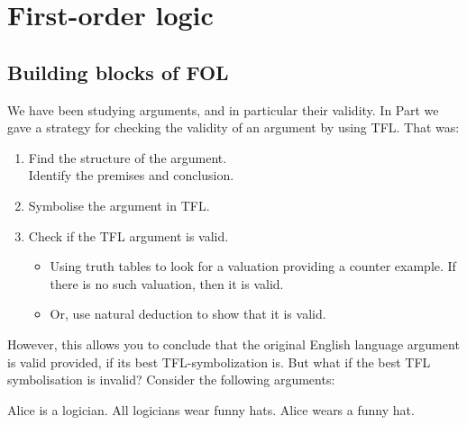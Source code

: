 \part{First-order logic}
\label{ch:FOL}
\chapter{Building blocks of FOL}\label{sec:FOLBuildingBlocks}
We have been studying arguments, and in particular their validity. In Part \label{ch:TFLsymb} we gave a strategy for checking the validity of an argument by using TFL. That was:
\begin{highlighted}\begin{enumerate}
\item Find the structure of the argument. \\Identify the premises and conclusion.
\item \label{itm:validity-symbolise}Symbolise the argument in TFL.
\item \label{itm:validity-TTs} Check if the TFL argument is valid.\begin{itemize}\item Using truth tables to look for a valuation providing a counter example. If there is no such valuation, then it is valid.
\item Or, use natural deduction to show that it is valid.
\end{itemize}
\end{enumerate}
\end{highlighted}

However, this allows you to conclude that the original English language argument is valid provided, if its best TFL-symbolization is. But what if the best TFL symbolisation is invalid? Consider the following arguments:
\begin{earg}
\label{arg:willard1}
\prem Alice is a logician.
\prem All logicians wear funny hats.
\conc Alice wears a funny hat.
\end{earg}

